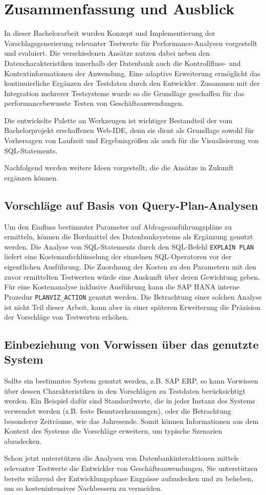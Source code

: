 \section{Zusammenfassung und Ausblick}\label{chap:conclusion}

In dieser Bachelorarbeit wurden Konzept und Implementierung der Vorschlagsgenerierung relevanter Testwerte für Performance-Analysen vorgestellt und evaluiert.
Die verschiedenen Ansätze nutzen dabei neben den Datencharakteristiken innerhalb der Datenbank auch die Kontrollfluss- und Kontextinformationen der Anwendung.
Eine adaptive Erweiterung ermöglicht das kontinuierliche Ergänzen der Testdaten durch den Entwickler.
Zusammen mit der Integration mehrerer Testsysteme wurde so die Grundlage geschaffen für das performancebewusste Testen von Geschäftsanwendungen.

Die entwickelte Palette an Werkzeugen ist wichtiger Bestandteil der vom Bachelorprojekt erschaffenen Web-IDE, denn sie dient als Grundlage sowohl für Vorhersagen von Laufzeit und Ergebnisgrößen als auch für die Visualisierung von SQL-Statements.

Nachfolgend werden weitere Ideen vorgestellt, die die Ansätze in Zukunft ergänzen können.

\subsection{Vorschläge auf Basis von Query-Plan-Analysen}
Um den Einfluss bestimmter Parameter auf Abfrageausführungspläne zu ermitteln, können die Bordmittel des Datenbanksystems als Ergänzung genutzt werden.
Die Analyse von SQL-Statements durch den SQL-Befehl \texttt{EXPLAIN PLAN} liefert eine Kostenaufschlüsselung der einzelnen SQL-Operatoren vor der eigentlichen Ausführung.
Die Zuordnung der Kosten zu den Parametern mit den zuvor ermittelten Testwerten würde eine Auskunft über deren Gewichtung geben.
Für eine Kostenanalyse inklusive Ausführung kann die SAP HANA interne Prozedur \texttt{PLANVIZ\_ACTION} genutzt werden.
Die Betrachtung einer solchen Analyse ist nicht Teil dieser Arbeit, kann aber in einer späteren Erweiterung die Präzision der Vorschläge von Testwerten erhöhen.

\subsection{Einbeziehung von Vorwissen über das genutzte System}
Sollte ein bestimmtes System genutzt werden, z.B. SAP ERP, so kann Vorwissen über dessen Charakteristiken in den Vorschlägen zu Testdaten berücksichtigt werden.
Ein Beispiel dafür sind Standardwerte, die in jeder Instanz des Systems verwendet werden (z.B. feste Benutzerkennungen), oder die Betrachtung besonderer Zeiträume, wie das Jahresende.
Somit können Informationen aus dem Kontext des Systems die Vorschläge erweitern, um typische Szenarien abzudecken.


Schon jetzt unterstützen die Analysen von Datenbankinteraktionen mittels relevanter Testwerte die Entwickler von Geschäftsanwendungen.
Sie unterstützen bereits während der Entwicklungsphase Engpässe aufzudecken und zu beheben, um so kostenintensives Nachbessern zu vermeiden.